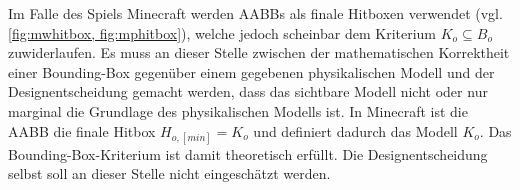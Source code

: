 Im Falle des Spiels Minecraft werden AABBs als finale Hitboxen verwendet (vgl. \ref{fig:mwhitbox, fig:mphitbox}), welche jedoch scheinbar dem Kriterium $K_o \subseteq B_o$ zuwiderlaufen. Es muss an dieser Stelle zwischen der mathematischen Korrektheit einer Bounding-Box gegenüber einem gegebenen physikalischen Modell und der Designentscheidung gemacht werden, dass das sichtbare Modell nicht oder nur marginal die Grundlage des physikalischen Modells ist. In Minecraft ist die AABB die finale Hitbox  $H_{o, [min]} = K_o$ und definiert dadurch das Modell $K_o$. Das Bounding-Box-Kriterium ist damit theoretisch erfüllt. Die Designentscheidung selbst soll an dieser Stelle nicht eingeschätzt werden.
